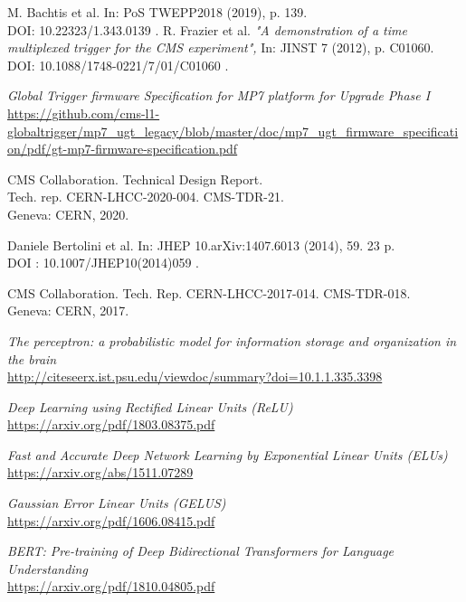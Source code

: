 \begin{thebibliography}{99}
M. Bachtis et al.
In: PoS TWEPP2018 (2019), p. 139. \\
DOI: 10.22323/1.343.0139 .
R. Frazier et al.
\textit{"A demonstration of a time multiplexed trigger for the CMS experiment",}
In: JINST 7 (2012), p. C01060.
DOI: 10.1088/1748-0221/7/01/C01060 .

\textit{Global Trigger firmware Specification for MP7 platform for Upgrade Phase I}
\\\url{https://github.com/cms-l1-globaltrigger/mp7_ugt_legacy/blob/master/doc/mp7_ugt_firmware_specification/pdf/gt-mp7-firmware-specification.pdf}

CMS Collaboration.
Technical Design Report. \\
Tech. rep. CERN-LHCC-2020-004. CMS-TDR-21. \\
Geneva: CERN, 2020.

Daniele Bertolini et al.
In: JHEP 10.arXiv:1407.6013 (2014), 59. 23 p. \\
DOI : 10.1007/JHEP10(2014)059 .

CMS Collaboration.
Tech. Rep. CERN-LHCC-2017-014. CMS-TDR-018. \\
Geneva: CERN, 2017.

\textit{The perceptron: a probabilistic model for information storage and organization in the brain}
\\\url{http://citeseerx.ist.psu.edu/viewdoc/summary?doi=10.1.1.335.3398}

\textit{Deep Learning using Rectified Linear Units (ReLU)}
\\\url{https://arxiv.org/pdf/1803.08375.pdf}

\textit{Fast and Accurate Deep Network Learning by Exponential Linear Units (ELUs)}
\\\url{https://arxiv.org/abs/1511.07289}

\textit{Gaussian Error Linear Units (GELUS)}
\\\url{https://arxiv.org/pdf/1606.08415.pdf}

\textit{BERT: Pre-training of Deep Bidirectional Transformers for
Language Understanding}
\\\url{https://arxiv.org/pdf/1810.04805.pdf}


\end{thebibliography}
